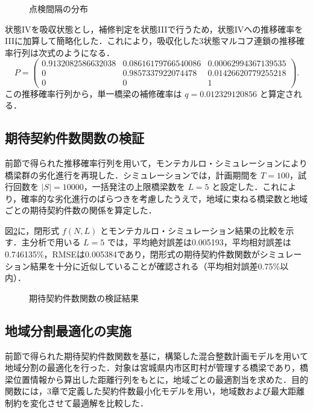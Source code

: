 \documentclass[Journal,letterpaper,InsideFigs,NoLineNumbers]{ascelike-new}
\begin{document}
\begin{figure}[h]
\centering
{}
\caption{点検間隔の分布}
\label{fig:inspection_interval}
\end{figure}

状態IVを吸収状態とし，補修判定を状態IIIで行うため，状態IVへの推移確率をIIIに加算して簡略化した．これにより，吸収化した3状態マルコフ連鎖の推移確率行列は次式のようになる．
\[
P =
\left(
\begin{array}{ccc}
0.9132082586632038 & 0.08616179766540086 & 0.00062994367139535 \\
0 & 0.9857337922074478 & 0.01426620779255218 \\
0 & 0 & 1
\end{array}
\right).
\]
この推移確率行列から，単一橋梁の補修確率は \(q=0.012329120856\) と算定される．

\subsection{期待契約件数関数の検証}

前節で得られた推移確率行列を用いて，モンテカルロ・シミュレーションにより橋梁群の劣化進行を再現した．シミュレーションでは，計画期間を \(T=100\)，試行回数を \(|S|=10000\)，一括発注の上限橋梁数を \(L=5\) と設定した．これにより，確率的な劣化進行のばらつきを考慮したうえで，地域に束ねる橋梁数と地域ごとの期待契約件数の関係を算定した．

図\ref{fig:expected_contracts}に，閉形式 \(f(N,L)\) とモンテカルロ・シミュレーション結果の比較を示す．主分析で用いる \(L=5\) では，平均絶対誤差は0.005193，平均相対誤差は0.746135\%，RMSEは0.005384であり，閉形式の期待契約件数関数がシミュレーション結果を十分に近似していることが確認される（平均相対誤差0.75\%以内）．

\begin{figure}[h]
\centering
{}
\caption{期待契約件数関数の検証結果}
\label{fig:expected_contracts}
\end{figure}

\subsection{地域分割最適化の実施}

前節で得られた期待契約件数関数を基に，構築した混合整数計画モデルを用いて地域分割の最適化を行った．対象は宮城県内市区町村が管理する橋梁であり，橋梁位置情報から算出した距離行列をもとに，地域ごとの最適割当を求めた．目的関数には，3章で定義した契約件数最小化モデルを用い，地域数および最大距離制約を変化させて最適解を比較した．
\end{document}
